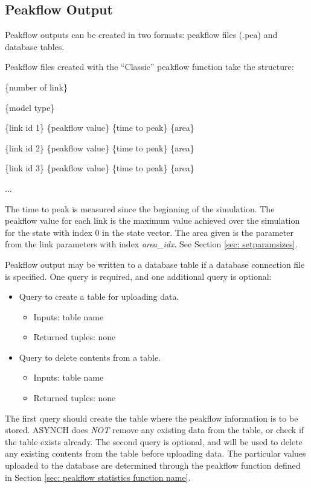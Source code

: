 \documentclass[12pt]{article}
\newenvironment{codeindent}
{\begin{list}{}
        {\setlength{\leftmargin}{.1in}}
        \item[]
}
{\end{list}}
\begin{document}
\subsection{Peakflow Output} \label{sec: peakflow output}

Peakflow outputs can be created in two formats: peakflow files (.pea) and database tables.

Peakflow files created with the ``Classic'' peakflow function take the structure:
\begin{codeindent}
 \{number of link\}
 
 \{model type\}
 
 \{link id 1\} \{peakflow value\} \{time to peak\} \{area\}
 
 \{link id 2\} \{peakflow value\} \{time to peak\} \{area\}
 
 \{link id 3\} \{peakflow value\} \{time to peak\} \{area\}
 
 ...
\end{codeindent}
The time to peak is measured since the beginning of the simulation. The peakflow value for each link is the maximum value achieved over the simulation for the state with index 0 in the state vector. The area given is the parameter from the link parameters with index \emph{area\_idx}. See Section \ref{sec: setparamsizes}.

Peakflow output may be written to a database table if a database connection file is specified. One query is required, and one additional query is optional:
\begin{itemize}
  \item Query to create a table for uploading data.
  \begin{itemize}
   \item Inputs: table name
   \item Returned tuples: none
  \end{itemize}
  \item Query to delete contents from a table.
  \begin{itemize}
   \item Inputs: table name
   \item Returned tuples: none
  \end{itemize}
\end{itemize}
The first query should create the table where the peakflow information is to be stored. ASYNCH does \emph{NOT} remove any existing data from the table, or check if the table exists already. The second query is optional, and will be used to delete any existing contents from the table before uploading data. The particular values uploaded to the database are determined through the peakflow function defined in Section \ref{sec: peakflow statistics function name}.
\end{document}
